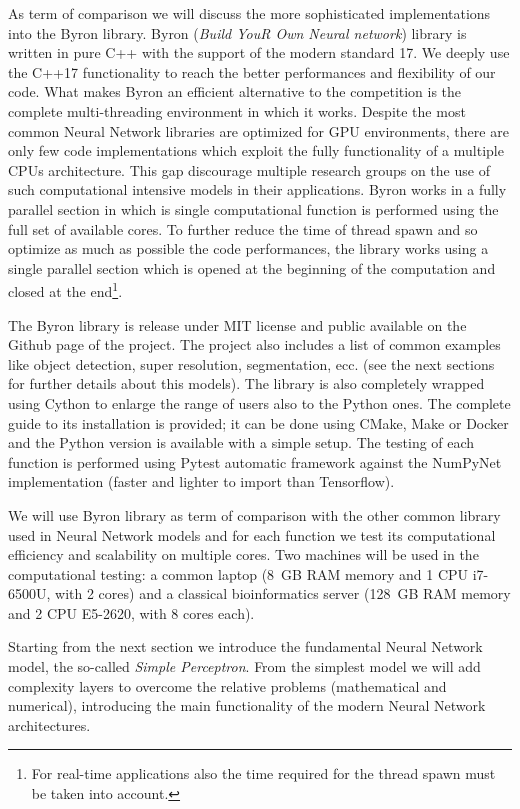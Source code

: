 \documentclass{standalone}
\begin{document}
As term of comparison we will discuss the more sophisticated implementations into the \textsf{Byron} library.
\textsf{Byron} (\emph{Build YouR Own Neural network}) library is written in pure \textsf{C++} with the support of the modern standard 17.
We deeply use the \textsf{C++17} functionality to reach the better performances and flexibility of our code.
What makes \textsf{Byron} an efficient alternative to the competition is the complete multi-threading environment in which it works.
Despite the most common Neural Network libraries are optimized for GPU environments, there are only few code implementations which exploit the fully functionality of a multiple CPUs architecture.
This gap discourage multiple research groups on the use of such computational intensive models in their applications.
\textsf{Byron} works in a fully parallel section in which is single computational function is performed using the full set of available cores.
To further reduce the time of thread spawn and so optimize as much as possible the code performances, the library works using a single parallel section which is opened at the beginning of the computation and closed at the end\footnote{
  For real-time applications also the time required for the thread spawn must be taken into account.
}.

The \textsf{Byron} library is release under \textsf{MIT} license and public available on the \textsf{Github} page of the project.
The project also includes a list of common examples like object detection, super resolution, segmentation, ecc. (see the next sections for further details about this models).
The library is also completely wrapped using \textsf{Cython} to enlarge the range of users also to the Python ones.
The complete guide to its installation is provided; it can be done using \textsf{CMake}, \textsf{Make} or \textsf{Docker} and the \textsf{Python} version is available with a simple \textsf{setup}.
The testing of each function is performed using \textsf{Pytest} automatic framework against the \textsf{NumPyNet} implementation (faster and lighter to import than \textsf{Tensorflow}).

We will use \textsf{Byron} library as term of comparison with the other common library used in Neural Network models and for each function we test its computational efficiency and scalability on multiple cores.
Two machines will be used in the computational testing: a common laptop (8~GB RAM memory and 1 CPU i7-6500U, with 2 cores) and a classical bioinformatics server (128~GB RAM memory and 2 CPU E5-2620, with 8 cores each).

Starting from the next section we introduce the fundamental Neural Network model, the so-called \emph{Simple Perceptron}.
From the simplest model we will add complexity layers to overcome the relative problems (mathematical and numerical), introducing the main functionality of the modern Neural Network architectures.
\end{document}
